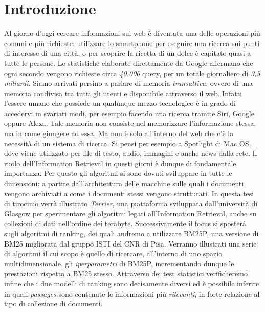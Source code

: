 \chapter{Introduzione}
Al giorno d'oggi cercare informazioni sul web è diventata una delle operazioni più comuni e più richieste:
utilizzare lo smartphone per eseguire una ricerca sui punti di interesse di una città, o per scoprire la ricetta di un dolce è capitato quasi a tutte le persone.
Le statistiche elaborate direttamente da Google affermano che ogni secondo vengono richieste circa \textit{40.000} query, per un totale
giornaliero di \textit{3,5 miliardi}.
Siamo arrivati persino a parlare di memoria \textit{transattiva}, ovvero di una memoria condivisa tra tutti gli utenti e disponibile attraverso il web.
Infatti l'essere umano che possiede un qualunque mezzo tecnologico è in grado di accedervi in svariati modi, per esempio facendo una ricerca tramite Siri, Google oppure Alexa.
Tale memoria non consiste nel memorizzare l'informazione stessa, ma in come giungere ad essa.
Ma non è solo all'interno del web che c'è la necessità di un sistema di ricerca. Si pensi per esempio a Spotlight di Mac OS, dove
viene utilizzato  per file di testo, audio, immagini e anche news dalla rete.
Il ruolo dell'Information Retrieval in questi giorni è dunque di fondamentale importanza.
Per questo gli algoritmi si sono dovuti sviluppare in tutte le dimensioni: a partire dall'architettura delle macchine sulle quali i documenti vengono archiviati a come i documenti stessi vengono strutturati. In questa tesi di tirocinio verrà illustrato \textit{Terrier}, una piattaforma sviluppata dall'università di Glasgow
per sperimentare gli algoritmi legati all'Information Retrieval, anche su collezioni di dati nell'ordine dei terabyte.  Successivamente il focus si sposterà
sugli algoritmi di ranking, dei quali andremo a utilizzare BM25P, una versione di BM25 migliorata dal gruppo ISTI del CNR di Pisa.
Verranno illustrati una serie di algoritmi il cui scopo è quello di ricercare, all'interno di uno spazio multidimensionale,
gli \textit{iperparametri} di BM25P, incrementando dunque le prestazioni rispetto a BM25 stesso.
Attraverso dei test statistici verificheremo infine che i due modelli di ranking sono decisamente diversi ed è possibile
inferire in quali \textit{passages} sono contenute le informazioni più \textit{rilevanti}, in forte relazione al tipo di collezione di documenti.